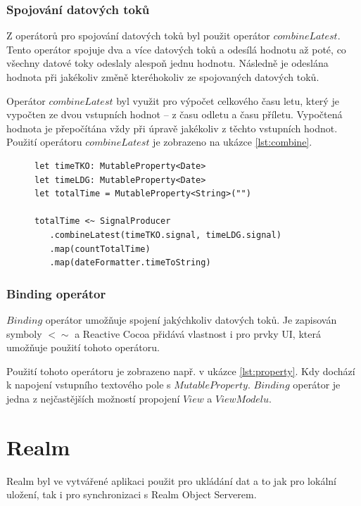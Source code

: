 \documentclass[thesis=M,czech]{FITthesis}[2012/06/26]
\begin{document}
\subsubsection{Spojování datových toků}
Z operátorů pro spojování datových toků byl použit operátor $combineLatest$. Tento operátor spojuje dva a více datových toků a odesílá hodnotu až poté, co všechny datové toky odeslaly alespoň jednu hodnotu. Následně je odeslána hodnota při jakékoliv změně kteréhokoliv ze spojovaných datových toků. \cite{operators}

Operátor $combineLatest$ byl využit pro výpočet celkového času letu, který je vypočten ze dvou vstupních hodnot -- z času odletu a času příletu. Vypočtená hodnota je přepočítána vždy při úpravě jakékoliv z těchto vstupních hodnot. Použití operátoru $combineLatest$ je zobrazeno na ukázce \ref{lst:combine}.

\begin{figure}
\begin{minipage}{\linewidth}
\begin{lstlisting}[caption={Ukázka použití spojení dvou datových toků},label={lst:combine}]
let timeTKO: MutableProperty<Date>
let timeLDG: MutableProperty<Date>
let totalTime = MutableProperty<String>("")

totalTime <~ SignalProducer
   .combineLatest(timeTKO.signal, timeLDG.signal)
   .map(countTotalTime)
   .map(dateFormatter.timeToString)
\end{lstlisting}
\end{minipage}
\end{figure}

\subsubsection{Binding operátor}
$Binding$ operátor umožňuje spojení jakýchkoliv datových toků. Je zapisován symboly $<\sim$  a Reactive Cocoa přidává vlastnost i pro prvky UI, která umožňuje použití tohoto operátoru. \cite{ReactiveCocoa}

Použití tohoto operátoru je zobrazeno např. v ukázce \ref{lst:property}. Kdy dochází k napojení vstupního textového pole s $MutableProperty$. $Binding$ operátor je jedna z nejčastějších možností propojení $View$ a $ViewModelu$.

\section{Realm}
Realm byl ve vytvářené aplikaci použit pro ukládání dat a to jak pro lokální uložení, tak i pro synchronizaci s Realm Object Serverem. 
\end{document}
